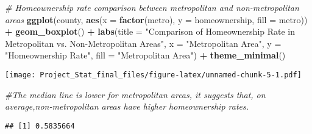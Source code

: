 \documentclass[
]{article}
\newenvironment{Shaded}{\begin{snugshade}}{\end{snugshade}}
\newcommand{\AttributeTok}[1]{\textcolor[rgb]{0.13,0.29,0.53}{#1}}
\newcommand{\CommentTok}[1]{\textcolor[rgb]{0.56,0.35,0.01}{\textit{#1}}}
\newcommand{\ConstantTok}[1]{\textcolor[rgb]{0.56,0.35,0.01}{#1}}
\newcommand{\FunctionTok}[1]{\textcolor[rgb]{0.13,0.29,0.53}{\textbf{#1}}}
\newcommand{\NormalTok}[1]{#1}
\newcommand{\OtherTok}[1]{\textcolor[rgb]{0.56,0.35,0.01}{#1}}
\newcommand{\SpecialCharTok}[1]{\textcolor[rgb]{0.81,0.36,0.00}{\textbf{#1}}}
\newcommand{\StringTok}[1]{\textcolor[rgb]{0.31,0.60,0.02}{#1}}
\begin{document}
\begin{Shaded}
\begin{Highlighting}[]
\CommentTok{\# Homeownership rate comparison between metropolitan and non{-}metropolitan areas}
\FunctionTok{ggplot}\NormalTok{(county, }\FunctionTok{aes}\NormalTok{(}\AttributeTok{x =} \FunctionTok{factor}\NormalTok{(metro), }\AttributeTok{y =}\NormalTok{ homeownership, }\AttributeTok{fill =}\NormalTok{ metro)) }\SpecialCharTok{+}
  \FunctionTok{geom\_boxplot}\NormalTok{() }\SpecialCharTok{+}
  \FunctionTok{labs}\NormalTok{(}\AttributeTok{title =} \StringTok{"Comparison of Homeownership Rate in Metropolitan vs. Non{-}Metropolitan Areas"}\NormalTok{,}
       \AttributeTok{x =} \StringTok{"Metropolitan Area"}\NormalTok{, }\AttributeTok{y =} \StringTok{"Homeownership Rate"}\NormalTok{, }\AttributeTok{fill =} \StringTok{"Metropolitan Area"}\NormalTok{) }\SpecialCharTok{+}
  \FunctionTok{theme\_minimal}\NormalTok{()}
\end{Highlighting}
\end{Shaded}

\texttt{[image: Project\_Stat\_final\_files/figure-latex/unnamed-chunk-5-1.pdf]}

\begin{Shaded}
\begin{Highlighting}[]
\CommentTok{\#The median line is lower for metropolitan areas, it suggests that, on average,non{-}metropolitan areas have higher homeownership rates.}
\end{Highlighting}
\end{Shaded}

\begin{Shaded}
\end{Shaded}

\begin{verbatim}
## [1] 0.5835664
\end{verbatim}
\end{document}

